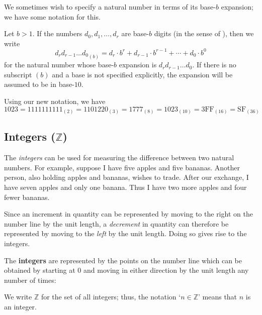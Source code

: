 We sometimes wish to specify a natural number in terms of its base-$b$ expansion; we have some notation for this.

\begin{notation}
Let $b>1$. If the numbers $d_0,d_1,\dots,d_r$ are base-$b$ digits (in the sense of ), then we write
\[ {d_rd_{r-1} \dots d_0}_{(b)} = d_r \cdot b^r + d_{r-1} \cdot b^{r-1} + \cdots + d_0 \cdot b^0 \]
for the natural number whose base-$b$ expansion is $d_rd_{r-1} \dots d_0$. If there is no subscript $(b)$ and a base is not specified explicitly, the expansion will be assumed to be in base-$10$.
\end{notation}

\begin{example}
Using our new notation, we have
\[ 1023 = 1111111111_{(2)} = 1101220_{(3)} = 1777_{(8)} = 1023_{(10)} = 3\mathrm{FF}_{(16)} = \mathrm{SF}_{(36)} \]
\end{example}

\subsection*{Integers ($\mathbb{Z}$)}

The \textit{integers} can be used for measuring the difference between two natural numbers. For example, suppose I have five apples and five bananas. Another person, also holding apples and bananas, wishes to trade. After our exchange, I have seven apples and only one banana. Thus I have two more apples and four fewer bananas.

Since an increment in quantity can be represented by moving to the right on the number line by the unit length, a \textit{decrement} in quantity can therefore be represented by moving to the \textit{left} by the unit length. Doing so gives rise to the integers.

\begin{definition}
\label{defIntegersInformal}
The \textbf{integers} are represented by the points on the number line which can be obtained by starting at $0$ and moving in either direction by the unit length any number of times:
\begin{center}
\end{center}
We write $\mathbb{Z}$  for the set of all integers; thus, the notation `$n \in \mathbb{Z}$' means that $n$ is an integer.
\end{definition}

